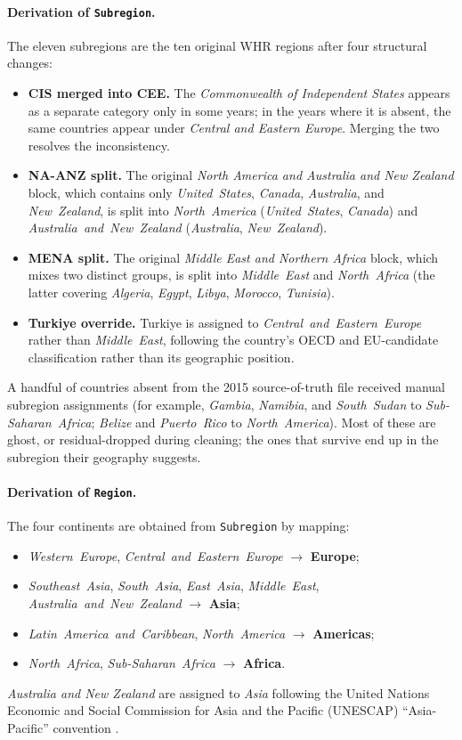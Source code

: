 \paragraph{Derivation of \texttt{Subregion}.} The eleven subregions are the ten original WHR regions after four structural changes:
\begin{itemize}
	\item \textbf{CIS merged into CEE.} The \emph{Commonwealth of Independent States} appears as a separate category only in some years; in the years where it is absent, the same countries appear under \emph{Central and Eastern Europe}. Merging the two resolves the inconsistency.
	\item \textbf{NA-ANZ split.} The original \emph{North America and Australia and New Zealand} block, which contains only \emph{United\ States}, \emph{Canada}, \emph{Australia}, and \emph{New\ Zealand}, is split into \emph{North\ America} (\emph{United\ States}, \emph{Canada}) and \emph{Australia\ and\ New\ Zealand} (\emph{Australia}, \emph{New\ Zealand}).
	\item \textbf{MENA split.} The original \emph{Middle East and Northern Africa} block, which mixes two distinct groups, is split into \emph{Middle\ East} and \emph{North\ Africa} (the latter covering \emph{Algeria}, \emph{Egypt}, \emph{Libya}, \emph{Morocco}, \emph{Tunisia}).
	\item \textbf{Turkiye override.} Turkiye is assigned to \emph{Central\ and\ Eastern\ Europe} rather than \emph{Middle\ East}, following the country's OECD and EU-candidate classification rather than its geographic position.
\end{itemize}
A handful of countries absent from the 2015 source-of-truth file received manual subregion assignments (for example, \emph{Gambia}, \emph{Namibia}, and \emph{South\ Sudan} to \emph{Sub-Saharan\ Africa}; \emph{Belize} and \emph{Puerto\ Rico} to \emph{North\ America}). Most of these are ghost, or residual-dropped during cleaning; the ones that survive end up in the subregion their geography suggests.

\paragraph{Derivation of \texttt{Region}.} The four continents are obtained from \texttt{Subregion} by mapping:
\begin{itemize}
	\item \emph{Western\ Europe}, \emph{Central\ and\ Eastern\ Europe} $\to$ \textbf{Europe};
	\item \emph{Southeast\ Asia}, \emph{South\ Asia}, \emph{East\ Asia}, \emph{Middle\ East}, \emph{Australia\ and\ New\ Zealand} $\to$ \textbf{Asia};
	\item \emph{Latin\ America\ and\ Caribbean}, \emph{North\ America} $\to$ \textbf{Americas};
	\item \emph{North\ Africa}, \emph{Sub-Saharan\ Africa} $\to$ \textbf{Africa}.
\end{itemize}
\emph{Australia and New Zealand} are assigned to \emph{Asia} following the United Nations Economic and Social Commission for Asia and the Pacific (UNESCAP) ``Asia-Pacific'' convention \parencite{unescap}.

